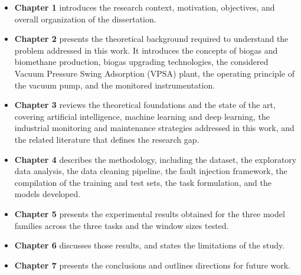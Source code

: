 \begin{itemize}

    \item \textbf{Chapter 1} introduces the research context, motivation, objectives, and overall organization of the dissertation.
    \item \textbf{Chapter 2} presents the theoretical background required to understand the problem addressed in this work. It introduces the concepts of biogas 
and biomethane production, biogas upgrading technologies, the considered Vacuum Pressure Swing Adsorption (VPSA) plant, the operating principle of the vacuum 
pump, and the monitored instrumentation.
    \item \textbf{Chapter 3} reviews the theoretical foundations and the state of the art, covering artificial
    intelligence, machine learning and deep learning, the industrial monitoring and maintenance strategies
    addressed in this work, and the related literature that defines the research gap.

    \item \textbf{Chapter 4} describes the methodology, including the dataset, the exploratory data analysis,
    the data cleaning pipeline, the fault injection framework, the compilation of the training and test sets,
    the task formulation, and the models developed.

    \item \textbf{Chapter 5} presents the experimental results obtained for the three model families across
    the three tasks and the window sizes tested.

    \item \textbf{Chapter 6} discusses those results, and states the limitations of the study.

    \item \textbf{Chapter 7} presents the conclusions and outlines directions for future work.

\end{itemize}